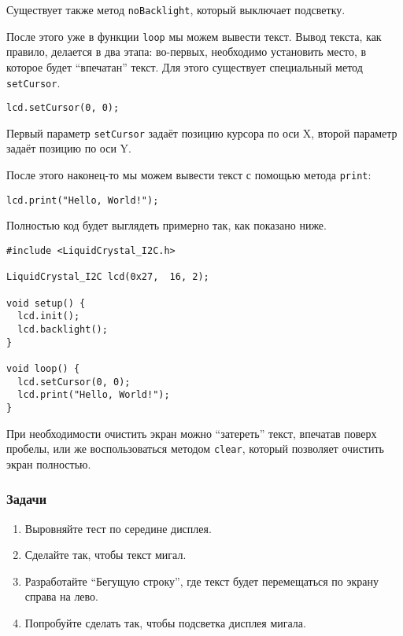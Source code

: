 \documentclass[../sparc.tex]{subfiles}
\begin{document}
Существует также метод \texttt{noBacklight}, который выключает подсветку.

После этого уже в функции \texttt{loop} мы можем вывести текст.  Вывод текста,
как правило, делается в два этапа: во-первых, необходимо установить место, в
которое будет ``впечатан'' текст.  Для этого существует специальный метод
\texttt{setCursor}.

\begin{verbatim}
lcd.setCursor(0, 0);
\end{verbatim}

Первый параметр \texttt{setCursor} задаёт позицию курсора по оси X, второй
параметр задаёт позицию по оси Y.

После этого наконец-то мы можем вывести текст с помощью метода \texttt{print}:

\begin{verbatim}
lcd.print("Hello, World!");
\end{verbatim}

Полностью код будет выглядеть примерно так, как показано ниже.

\begin{verbatim}
#include <LiquidCrystal_I2C.h>

LiquidCrystal_I2C lcd(0x27,  16, 2);

void setup() {
  lcd.init();
  lcd.backlight();
}

void loop() {
  lcd.setCursor(0, 0);
  lcd.print("Hello, World!");
}
\end{verbatim}

При необходимости очистить экран можно ``затереть'' текст, впечатав поверх
пробелы, или же воспользоваться методом \texttt{clear}, который позволяет
очистить экран полностью.

\subsubsection{Задачи}
\begin{enumerate}
\item Выровняйте тест по середине дисплея.
\item Сделайте так, чтобы текст мигал.
\item Разработайте ``Бегущую строку'', где текст будет перемещаться по экрану
  справа на лево.
\item Попробуйте сделать так, чтобы подсветка дисплея мигала.
\end{enumerate}
\end{document}
